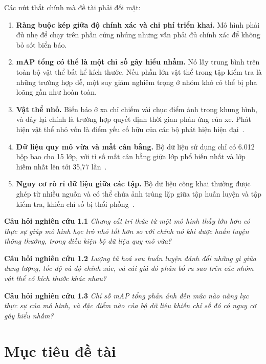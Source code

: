 Các nút thắt chính mà đề tài phải đối mặt:

\begin{enumerate}[leftmargin=1.5cm]
\item \textbf{Ràng buộc kép giữa độ chính xác và chi phí triển khai.} Mô hình phải đủ nhẹ để chạy
trên phần cứng nhúng nhưng vẫn phải đủ chính xác để không bỏ sót biển báo.

\item \textbf{mAP tổng có thể là một chỉ số gây hiểu nhầm.} Nó lấy trung bình trên toàn bộ vật thể
bất kể kích thước. Nếu phần lớn vật thể trong tập kiểm tra là những trường hợp dễ, một suy giảm
nghiêm trọng ở nhóm khó có thể bị pha loãng gần như hoàn toàn.

\item \textbf{Vật thể nhỏ.} Biển báo ở xa chỉ chiếm vài chục điểm ảnh trong khung hình, và đây lại
chính là trường hợp quyết định thời gian phản ứng của xe. Phát hiện vật thể nhỏ vốn là điểm yếu cố
hữu của các bộ phát hiện hiện đại~\cite{tong2020smallobject}.

\item \textbf{Dữ liệu quy mô vừa và mất cân bằng.} Bộ dữ liệu sử dụng chỉ có 6.012 hộp bao cho 15
lớp, với tỉ số mất cân bằng giữa lớp phổ biến nhất và lớp hiếm nhất lên tới 35,77
lần~\cite{johnson2019imbalance}.

\item \textbf{Nguy cơ rò rỉ dữ liệu giữa các tập.} Bộ dữ liệu công khai thường được ghép từ nhiều
nguồn và có thể chứa ảnh trùng lặp giữa tập huấn luyện và tập kiểm tra, khiến chỉ số bị thổi
phồng~\cite{barz2020duplicates}.
\end{enumerate}

\noindent\textbf{Câu hỏi nghiên cứu 1.1} \textit{Chưng cất tri thức từ một mô hình thầy lớn hơn có
thực sự giúp mô hình học trò nhỏ tốt hơn so với chính nó khi được huấn luyện thông thường, trong
điều kiện bộ dữ liệu quy mô vừa?}

\noindent\textbf{Câu hỏi nghiên cứu 1.2} \textit{Lượng tử hoá sau huấn luyện đánh đổi những gì
giữa dung lượng, tốc độ và độ chính xác, và cái giá đó phân bố ra sao trên các nhóm vật thể có kích
thước khác nhau?}

\noindent\textbf{Câu hỏi nghiên cứu 1.3} \textit{Chỉ số mAP tổng phản ánh đến mức nào năng lực thực
sự của mô hình, và đặc điểm nào của bộ dữ liệu khiến chỉ số đó có nguy cơ gây hiểu nhầm?}

\section{Mục tiêu đề tài}

